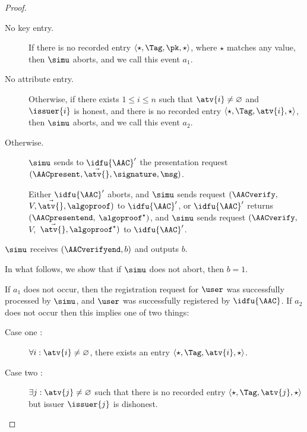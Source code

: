 \begin{proof}
\begin{description}
      \begin{description}

	\item[No key entry.] If there is no recorded entry $\langle \star, \Tag,
\pk, \star\rangle$, where $\star$ matches any value, then $\simu$ aborts, and we call this event $a_1$.

	\item[No attribute entry.] Otherwise, if there exists $1 \leq i \leq n$
such that $\atv{i} \neq \varnothing$ and $\issuer{i}$ is honest, and there is no
recorded entry $\langle \star, \Tag, \atv{i}, \star \rangle$, then $\simu$
aborts, and we call this event $a_2$.

	\item[Otherwise.] $\simu$ sends to $\idfu{\AAC}'$ the presentation request
$(\AACpresent, \vec{\atv{}}, \signature, \msg)$.

	  Either $\idfu{\AAC}'$ aborts, and $\simu$ sends request $(\AACverify,$ $V,\vec{\atv{}}, \algoproof)$ to $\idfu{\AAC}'$, or $\idfu{\AAC}'$ returns
$(\AACpresentend,$ $\algoproof^\star)$, and $\simu$ sends request $(\AACverify,$ $V,$
$\vec{\atv{}}, \algoproof^\star)$ to $\idfu{\AAC}'$.

      \end{description}

      $\simu$ receives $(\AACverifyend, b)$ and outputs $b$.

  \end{description}

  In what follows, we show that if $\simu$ does not abort, then $b = 1$.

  If $a_1$ does not occur, then the registration request for $\user$ was
successfully processed by $\simu$, and $\user$ was successfully registered by
$\idfu{\AAC}$.  If $a_2$ does not occur then this implies one of two things:

  \begin{description}

    \item[Case one :] $\forall i : \atv{i} \neq \varnothing$, there exists an
entry $\langle \star, \Tag, \atv{i}, \star \rangle$.

    \item[Case two :]  $\exists j: \atv{j} \neq \varnothing$ such that there is
no recorded entry $\langle \star, \Tag, \atv{j}, \star \rangle$ but issuer
$\issuer{j}$ is dishonest.

  \end{description}


\end{proof}
